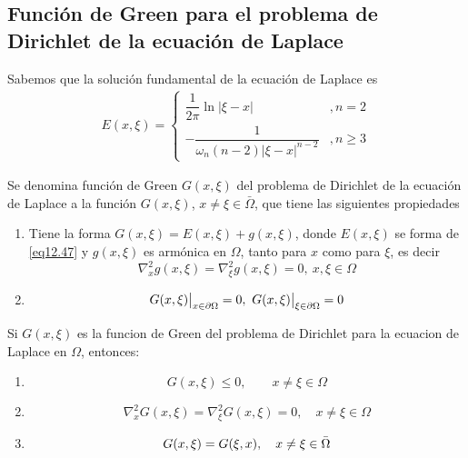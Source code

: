 \documentclass[../main]{subfiles}
\begin{document}
    \subsection{Función de Green para el problema de Dirichlet de la ecuación de Laplace}
    Sabemos que la solución fundamental de la ecuación de Laplace es
    \begin{equation}
        \begin{split}
            E(x, \xi)=
            \left\{
            \begin{array}{cc}
              \displaystyle \dfrac{1}{2\pi}\ln{|\xi-x|}   & ,n=2 \\
              \displaystyle -\dfrac{1}{\omega_n(n-2)|\xi-x|^{n-2}}   & ,n\geq 3
            \end{array}
            \right.
        \end{split}
        \label{eq12.47}
    \end{equation}
    \begin{definicion}
        Se denomina función de Green $G(x,\xi)$ del problema de Dirichlet de la ecuación de Laplace a la función $G(x,\xi)$, $x\neq \xi \in \bar{\Omega}$, que tiene las siguientes propiedades
        \begin{enumerate}
            \item Tiene la forma $G(x,\xi)=E(x,\xi)+g(x,\xi)$, donde $E(x,\xi)$ se forma de \eqref{eq12.47} y $g(x,\xi)$ es armónica en $\Omega$, tanto para $x$ como para $\xi$, es decir 
            \begin{equation}
                \nabla^2_x g(x,\xi)=\nabla^2_{\xi} g(x,\xi)=0, \ x,\xi \in \Omega
            \end{equation}
            \item $$G(x,\xi)\big{|}_{x  \in   \partial \Omega}=0, \ G(x,\xi)\big{|}_{\xi  \in  \partial \Omega}=0$$
        \end{enumerate}
    \end{definicion}
    \begin{proposicion}
        Si $G(x,\xi)$ es la funcion de Green del problema de Dirichlet para la ecuacion de Laplace en $\Omega$, entonces:
        \begin{enumerate}
            \item $$G(x,\xi)\leq0, \qquad x\neq \xi \in \Omega$$
            \item $$\nabla^2_x G(x,\xi)=\nabla^2_{\xi} G(x,\xi)=0, \quad x\neq \xi \in \Omega$$
            \item $$G(x,\xi)=G(\xi,x), \quad x\neq \xi \in \Bar{\Omega}$$
        \end{enumerate}
    \end{proposicion}
\end{document}
